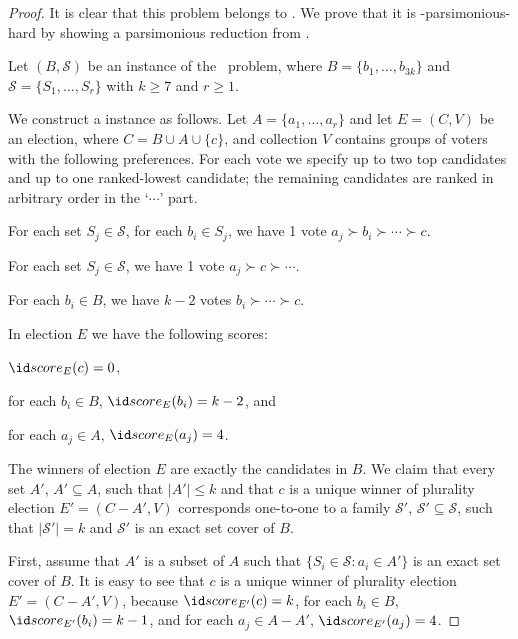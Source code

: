 \begin{proof}
It is clear that this problem belongs to \sharpPclass.
We prove that it is \sharpPclass-parsimonious-hard by showing a parsimonious reduction from \sharpXthreeC.

Let $(B,\mathcal{S})$ be an instance of the \sharpXthreeC\ problem, where $B=\{b_1,\dots,b_{3k}\}$ and $\mathcal{S}=\{S_1,\dots,S_r\}$ with $k\ge7$ and $r\ge1$.

We construct a  instance as follows.
Let $A=\{a_1,\dots,a_r\}$ and let $E=(C,V)$ be an election, where $C=B\cup A\cup\{c\}$, and collection $V$ contains groups of voters with the following preferences.
For each vote we specify up to two top candidates and up to one ranked-lowest candidate; the remaining candidates are ranked in arbitrary order in the `$\cdots$' part.
\begin{Enumerate}
	\item For each set $S_j\in\mathcal{S}$, for each $b_i\in S_j$, we have 1 vote $a_j\succ b_i\succ\cdots\succ c$.
	\item For each set $S_j\in\mathcal{S}$, we have 1 vote $a_j\succ c\succ\cdots$.
	\item For each $b_i\in B$, we have $k-2$ votes $b_i\succ\cdots\succ c$.
\end{Enumerate}
In election $E$ we have the following scores:
\begin{Enumerate}
	\item $\score{E}(c)=0$,
	\item for each $b_i\in B$, $\score{E}(b_i)=k-2$, and
	\item for each $a_j\in A$, $\score{E}(a_j)=4$.
\end{Enumerate}
The winners of election $E$ are exactly the candidates in $B$.
We claim that every set $A'$, $A'\subseteq A$, such that $|A'|\le k$ and that $c$ is a unique winner of plurality election $E'=(C-A',V)$ corresponds one-to-one to a family $\mathcal{S'}$, $\mathcal{S'}\subseteq\mathcal{S}$, such that $|\mathcal{S'}|=k$ and $\mathcal{S'}$ is an exact set cover of $B$.

First, assume that $A'$ is a subset of $A$ such that $\{S_i\in\mathcal{S}:a_i\in A'\}$ is an exact set cover of $B$.
It is easy to see that $c$ is a unique winner of plurality election $E'=(C-A',V)$, because $\score{E'}(c)=k$, for each $b_i\in B$, $\score{E'}(b_i)=k-1$, and for each $a_j\in A-A'$, $\score{E'}(a_j)=4$.


\end{proof}

